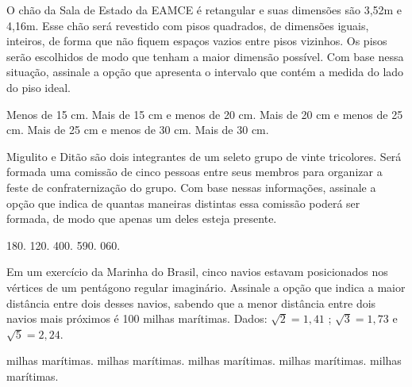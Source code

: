 \begin{question}%
O chão da Sala de Estado da EAMCE é retangular e suas dimensões são 3,52m e 4,16m. Esse chão será revestido com pisos quadrados, de dimensões iguais, inteiros, de forma que não fiquem espaços vazios entre pisos vizinhos. Os pisos serão escolhidos de modo que tenham a maior dimensão possível. Com base nessa situação, assinale a opção que apresenta o intervalo que contém a medida do lado do piso ideal.
    \begin{tasks}
        \task Menos de 15 cm.
        \task Mais de 15 cm e menos de 20 cm.
        \task Mais de 20 cm e menos de 25 cm.
        \task Mais de 25 cm e menos de 30 cm.
        \task Mais de 30 cm.
    \end{tasks}
\end{question}

\begin{question}%
Migulito e Ditão são dois integrantes de um seleto grupo de vinte tricolores. Será formada uma comissão de cinco pessoas entre seus membros para organizar a feste de confraternização do grupo. Com base nessas informações, assinale a opção que indica de quantas maneiras distintas essa comissão poderá ser formada, de modo que apenas um deles esteja presente.
    \begin{tasks}
         180.
         120.
         400.
         590.
         060.
    \end{tasks}
\end{question}

\begin{question}%
Em um exercício da Marinha do Brasil, cinco navios estavam posicionados nos vértices de um pentágono regular imaginário. Assinale a opção que indica a maior distância entre dois desses navios, sabendo que a menor distância entre dois navios mais próximos é 100 milhas marítimas. Dados: \(\sqrt{2} = 1,41\) ; \( \sqrt{3} = 1,73\) e \(\sqrt{5} = 2,24\).
    \begin{tasks}
         milhas marítimas.
         milhas marítimas.
         milhas marítimas.
         milhas marítimas.
         milhas marítimas.
    \end{tasks}
\end{question}

